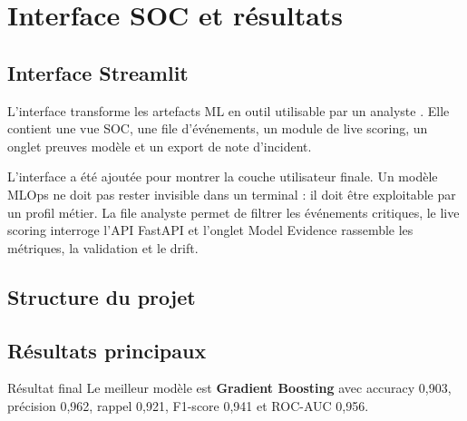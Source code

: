 \chapter{Interface SOC et résultats}

\section{Interface Streamlit}
L'interface  transforme les artefacts ML en outil utilisable par un analyste \cite{streamlit_app}. Elle contient une vue SOC, une file d'événements, un module de live scoring, un onglet preuves modèle et un export de note d'incident.

L'interface a été ajoutée pour montrer la couche utilisateur finale. Un modèle MLOps ne doit pas rester invisible dans un terminal : il doit être exploitable par un profil métier. La file analyste permet de filtrer les événements critiques, le live scoring interroge l'API FastAPI et l'onglet Model Evidence rassemble les métriques, la validation et le drift.


\section{Structure du projet}

\section{Résultats principaux}
\begin{cyberbox}{Résultat final}
Le meilleur modèle est \textbf{Gradient Boosting} avec accuracy 0,903, précision 0,962, rappel 0,921, F1-score 0,941 et ROC-AUC 0,956.
\end{cyberbox}

